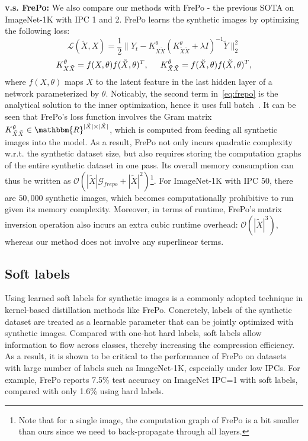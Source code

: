 \documentclass[10pt,twocolumn,letterpaper]{article}
\begin{document}
\textbf{v.s. FrePo:} We also compare our methods with FrePo - the previous SOTA on ImageNet-1K with IPC 1 and 2. FrePo learns the synthetic images by optimizing the following loss:
\begin{equation}
    \label{eq:frepo}
    \mathcal{L}(\tilde{X}, X) = \frac{1}{2}\| Y_t - K_{X\tilde{X}}^\theta(K_{\tilde{X}\tilde{X}}^\theta + \lambda\textit{I})^{-1}\tilde{Y} \|_2^2
\end{equation}
\begin{equation*}
    K_{X\tilde{X}}^\theta = f(X,\theta)f(\tilde{X},\theta)^T, \hspace{0.5cm} K_{\tilde{X}\tilde{X}}^\theta = f(\tilde{X},\theta)f(\tilde{X}, \theta)^T, 
\end{equation*}
where $f(X, \theta)$ maps $X$ to the latent feature in the last hidden layer of a network parameterized by $\theta$.
Noticably, the second term in~\cref{eq:frepo} is the analytical solution to the inner optimization, hence it uses full batch~\cite{zhou2022dataset}.
It can be seen that FrePo's loss function involves the Gram matrix $K_{\tilde{X}\tilde{X}}^\theta \in \mathbbm{R}^{|\tilde{X}|\times |\tilde{X}|}$, which is computed from feeding all synthetic images into the model.
As a result, FrePo not only incurs quadratic complexity w.r.t. the synthetic dataset size, but also requires storing the computation graphs of the entire synthetic dataset in one pass.
Its overall memory consumption can thus be written as $\mathcal{O}(|\tilde{X}| \mathcal{G}_{frepo} + |\tilde{X}|^2)$\footnote{Note that for a single image, the computation graph of FrePo is a bit smaller than ours since we need to back-propagate through all layers.}.
For ImageNet-1K with IPC 50, there are $50,000$ synthetic images, which becomes computationally prohibitive to run given its memory complexity.
Moreover, in terms of runtime, FrePo's matrix inversion operation also incurs an extra cubic runtime overhead: $\mathcal{O}(|\tilde{X}|^3)$, whereas our method does not involve any superlinear terms.


\subsection{Soft labels}
\label{sec.soft_label}
Using learned soft labels for synthetic images is a commonly adopted technique in kernel-based distillation methods like FrePo.
Concretely, labels of the synthetic dataset are treated as a learnable parameter that can be jointly optimized with synthetic images.
Compared with one-hot hard labels, soft labels allow information to flow across classes, thereby increasing the compression efficiency.
As a result, it is shown to be critical to the performance of FrePo on datasets with large number of labels such as ImageNet-1K, especially under low IPCs.
For example, FrePo reports 7.5\% test accuracy on ImageNet IPC=1 with soft labels, compared with only 1.6\% using hard labels.
\end{document}
